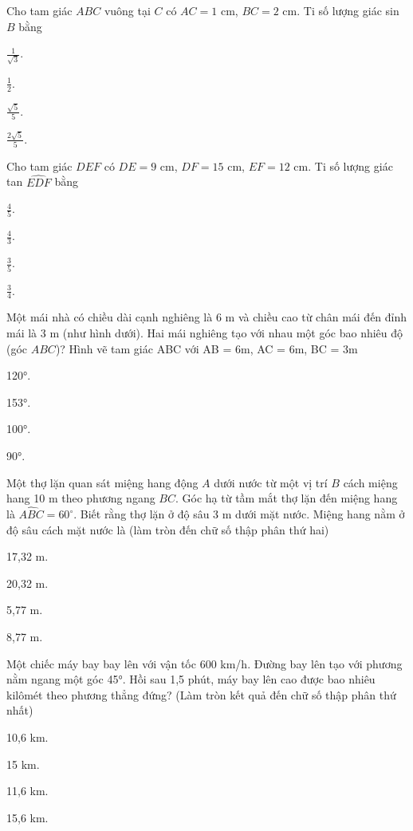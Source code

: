 \documentclass[%
    fontsize=12pt,%
    chapterprefix=false,%
    open=right,%
    twoside=false,%
    numbers=noenddot,%
    headings=optiontohead,%
    final,%
    DIV=15,%
    parskip=half %
]{scrbook}
\begin{document}
\begin{tracnghiem}
\item Cho tam giác $ ABC $ vuông tại $ C $ có $ AC = 1 $ cm, $ BC = 2 $ cm. Ti số lượng giác sin $ B $ bằng
\begin{options}
  \item $ \frac{1}{\sqrt{3}} $.
  \item $ \frac{1}{2} $.
  \item $ \frac{\sqrt{5}}{5} $.
  \item $ \frac{2\sqrt{5}}{5} $.
\end{options}

\item Cho tam giác $ DEF $ có $ DE = 9 $ cm, $ DF = 15 $ cm, $ EF = 12 $ cm. Ti số lượng giác tan $ \widehat{EDF} $ bằng
\begin{options}
  \item $ \frac{4}{5} $.
  \item $ \frac{4}{3} $.
  \item $ \frac{3}{5} $.
  \item $ \frac{3}{4} $.
\end{options}

\item Một mái nhà có chiều dài cạnh nghiêng là 6 m và chiều cao từ chân mái đến đỉnh mái là 3 m (như hình dưới). Hai mái nghiêng tạo với nhau một góc bao nhiêu độ (góc $ ABC $)? Hình vẽ tam giác ABC với AB = 6m, AC = 6m, BC = 3m
\begin{options}
  \item 120°.
  \item 153°.
  \item 100°.
  \item 90°.
\end{options}

\item Một thợ lặn quan sát miệng hang động $ A $ dưới nước từ một vị trí $ B $ cách miệng hang 10 m theo phương ngang $ BC $. Góc hạ từ tầm mắt thợ lặn đến miệng hang là $ \widehat{ABC} = 60^\circ $. Biết rằng thợ lặn ở độ sâu 3 m dưới mặt nước. Miệng hang nằm ở độ sâu cách mặt nước là (làm tròn đến chữ số thập phân thứ hai)
\begin{options}
  \item 17,32 m.
  \item 20,32 m.
  \item 5,77 m.
  \item 8,77 m.
\end{options}

\item Một chiếc máy bay bay lên với vận tốc 600 km/h. Đường bay lên tạo với phương nằm ngang một góc 45°. Hồi sau 1,5 phút, máy bay lên cao được bao nhiêu kilômét theo phương thẳng đứng? (Làm tròn kết quả đến chữ số thập phân thứ nhất)
\begin{options}
  \item 10,6 km.
  \item 15 km.
  \item 11,6 km.
  \item 15,6 km.
\end{options}


\end{tracnghiem}
\end{document}
